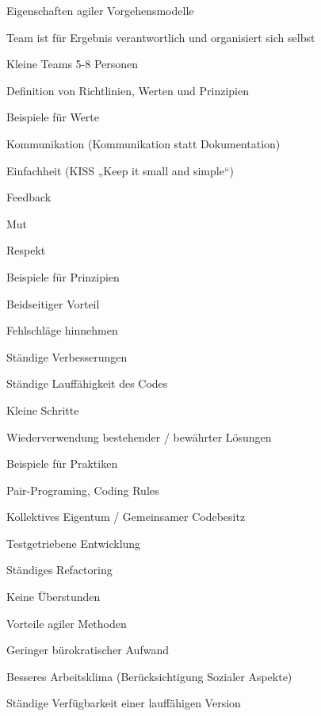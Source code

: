 \documentclass[a4paper]{article}
\begin{document}
\begin{multicols}{3}
  Eigenschaften agiler Vorgehensmodelle
  \begin{itemize*}
    \item Team ist für Ergebnis verantwortlich und organisiert sich selbst
    \item Kleine Teams 5-8 Personen
    \item Definition von Richtlinien, Werten und Prinzipien
    \item Beispiele für Werte
    \begin{itemize*}
      \item Kommunikation (Kommunikation statt Dokumentation)
      \item Einfachheit (KISS „Keep it small and simple“)
      \item Feedback
      \item Mut
      \item Respekt
    \end{itemize*}
    \item Beispiele für Prinzipien
    \begin{itemize*}
      \item Beidseitiger Vorteil
      \item Fehlschläge hinnehmen
      \item Ständige Verbesserungen
      \item Ständige Lauffähigkeit des Codes
      \item Kleine Schritte
      \item Wiederverwendung bestehender / bewährter Lösungen
    \end{itemize*}
    \item Beispiele für Praktiken
    \begin{itemize*}
      \item Pair-Programing, Coding Rules
      \item Kollektives Eigentum / Gemeinsamer Codebesitz
      \item Testgetriebene Entwicklung
      \item Ständiges Refactoring
      \item Keine Überstunden
    \end{itemize*}
    \item Vorteile agiler Methoden
    \begin{itemize*}
      \item Geringer bürokratischer Aufwand
      \item Besseres Arbeitsklima (Berücksichtigung Sozialer Aspekte)
      \item Ständige Verfügbarkeit einer lauffähigen Version

\end{itemize*}
\end{itemize*}
\end{multicols}
\end{document}
